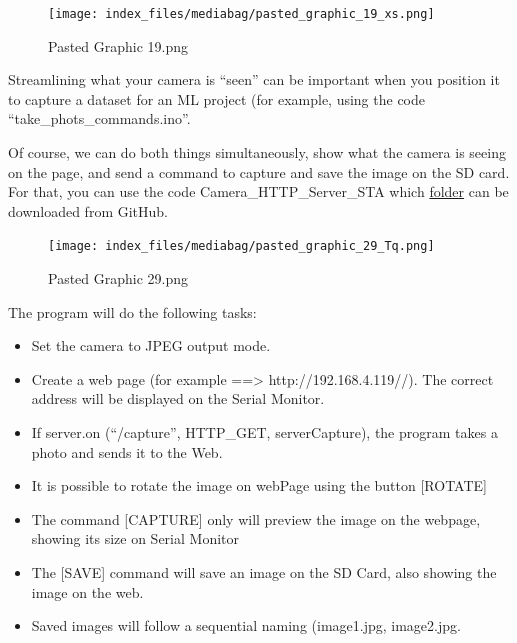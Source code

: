 \documentclass[
  letterpaper,
  DIV=11,
  numbers=noendperiod]{scrreprt}
\providecommand{\tightlist}{%
  \setlength{\itemsep}{0pt}\setlength{\parskip}{0pt}}\usepackage{longtable,booktabs,array}
\begin{document}
\begin{figure}[H]

{\centering \texttt{[image: index\_files/mediabag/pasted\_graphic\_19\_xs.png]}

}

\caption{Pasted Graphic 19.png}

\end{figure}

Streamlining what your camera is ``seen'' can be important when you
position it to capture a dataset for an ML project (for example, using
the code ``take\_phots\_commands.ino''.

Of course, we can do both things simultaneously, show what the camera is
seeing on the page, and send a command to capture and save the image on
the SD card. For that, you can use the code Camera\_HTTP\_Server\_STA
which
\href{https://github.com/Mjrovai/XIAO-ESP32S3-Sense/tree/main/Camera_HTTP_Server_STA}{folder}
can be downloaded from GitHub.

\begin{figure}[H]

{\centering \texttt{[image: index\_files/mediabag/pasted\_graphic\_29\_Tq.png]}

}

\caption{Pasted Graphic 29.png}

\end{figure}

The program will do the following tasks:

\begin{itemize}
\tightlist
\item
  Set the camera to JPEG output mode.
\item
  Create a web page (for example ==\textgreater{}
  http://192.168.4.119//). The correct address will be displayed on the
  Serial Monitor.
\item
  If server.on (``/capture'', HTTP\_GET, serverCapture), the program
  takes a photo and sends it to the Web.
\item
  It is possible to rotate the image on webPage using the button
  {[}ROTATE{]}
\item
  The command {[}CAPTURE{]} only will preview the image on the webpage,
  showing its size on Serial Monitor
\item
  The {[}SAVE{]} command will save an image on the SD Card, also showing
  the image on the web.
\item
  Saved images will follow a sequential naming (image1.jpg, image2.jpg.
\end{itemize}
\end{document}
